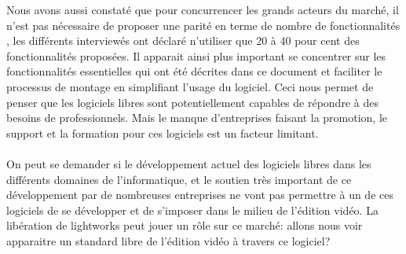Nous avons aussi constaté que pour concurrencer les grands acteurs du
marché, il n'est pas nécessaire de proposer une parité en terme de
nombre de fonctionnalités , les différents interviewés ont déclaré
n'utiliser que 20 à 40 pour cent des fonctionnalités proposées. Il
apparait ainsi plus important se concentrer sur les fonctionnalités
essentielles qui ont été décrites dans ce document et
faciliter le processus de montage en simplifiant l'usage du logiciel. Ceci
nous permet de penser que les logiciels libres sont potentiellement
capables de répondre à des besoins de professionnels.  Mais le manque
d'entreprises faisant la promotion, le support et la formation pour ces
logiciels est un facteur limitant.

\paragraph{}

On peut se demander si le développement actuel des logiciels libres
dans les différents domaines de l'informatique, et le soutien très
important de ce développement par de nombreuses entreprises ne vont pas
permettre à un de ces logiciels de se développer et de s'imposer dans
le milieu de l'édition vidéo.  La libération de lightworks peut jouer
un rôle sur ce marché: allons nous voir apparaitre un standard libre
de l'édition vidéo à travers ce logiciel?
